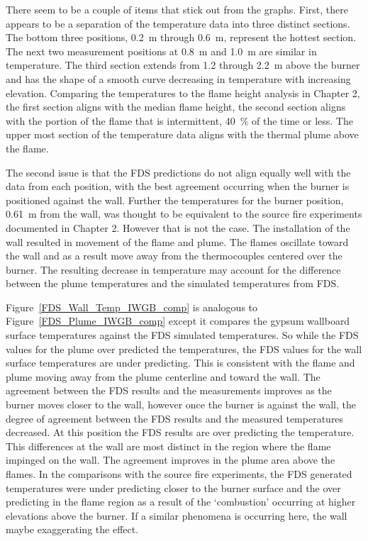 \documentclass[twoside]{uocthesis}
\begin{document}
{ There seem to be a couple of items that stick out from the graphs.  First, there appears to be a separation of the temperature data into three distinct sections.  The bottom three positions, 0.2~m through 0.6~m, represent the hottest section.  The next two measurement positions at 0.8~m and 1.0~m are similar in temperature.  The third section extends from 1.2 through 2.2~m above the burner and has the shape of a smooth curve decreasing in temperature with increasing elevation.  Comparing the temperatures to the flame height analysis in Chapter 2, the first section aligns with the median flame height, the second section aligns with the portion of the flame that is intermittent, 40~$\%$ of the time or less.  The upper most section of the temperature data aligns with the thermal plume above the flame.  

 The second issue is that the FDS predictions do not align equally well with the data from each position, with the best agreement occurring when the burner is positioned against the wall.  Further the temperatures for the burner position, 0.61~m from the wall, was thought to be equivalent to the source fire experiments documented in Chapter 2. However that is not the case.  The installation of the wall resulted in movement of the flame and plume.  The flames oscillate toward the wall and as a result move away from the thermocouples centered over the burner. The resulting decrease in temperature may account for the difference between the plume temperatures and the simulated temperatures from FDS.                     

Figure~\ref{FDS_Wall_Temp_IWGB_comp} is analogous to Figure~\ref{FDS_Plume_IWGB_comp} except it compares the gypsum wallboard surface temperatures against the FDS simulated temperatures.  So while the FDS values for the plume over predicted the temperatures, the FDS values for the wall surface temperatures are under predicting.  This is consistent with the flame and plume moving away from the plume centerline and toward the wall.  The agreement between the FDS results and the measurements improves as the burner moves closer to the wall, however once the burner is against the wall, the degree of agreement between the FDS results and the measured temperatures decreased.  At this position the FDS results are over predicting the temperature. This differences at the wall are most distinct in the region where the flame impinged on the wall.  The agreement improves in the plume area above the flames.  In the comparisons with the source fire experiments, the FDS generated temperatures were under predicting closer to the burner surface and the over predicting in the flame region as a result of the `combustion' occurring at higher elevations above the burner.  If a similar phenomena is occurring here, the wall maybe exaggerating the effect.      

}
\end{document}
